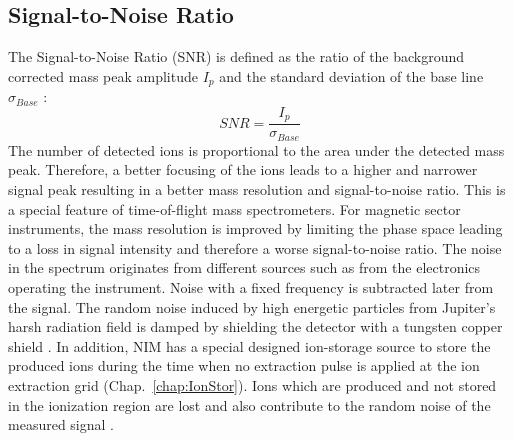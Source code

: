 	\subsection{Signal-to-Noise Ratio }
	The Signal-to-Noise Ratio (SNR) is defined as the ratio of the background corrected mass peak amplitude $I_{p}$ and the standard deviation of the base line $\sigma_{Base}$ \cite{Agilent_TechNote_SNR,Master_Meyer}: %
	\begin{equation}
		SNR = \frac{I_{p}}{\sigma_{Base}}
		\label{eq:SNR}
	\end{equation}
	The number of detected ions is proportional to the area under the detected mass peak. Therefore, a better focusing of the ions leads to a higher and narrower signal peak resulting in a better mass resolution and signal-to-noise ratio. This is a special feature of time-of-flight mass spectrometers. For magnetic sector instruments, the mass resolution is improved by limiting the phase space leading to a loss in signal intensity and therefore a worse signal-to-noise ratio. The noise in the spectrum originates from different sources such as from the electronics operating the instrument. Noise with a fixed frequency is subtracted later from the signal. The random noise induced by high energetic particles from Jupiter's harsh radiation field is damped by shielding the detector with a tungsten copper shield \cite{Foehn2021}. In addition, NIM has a special designed ion-storage source to store the produced ions during the time when no extraction pulse is applied at the ion extraction grid (Chap.~\ref{chap:IonStor}). Ions which are produced and not stored in the ionization region are lost and also contribute to the random noise of the measured signal \cite{Diss_Abplanalp}. 


